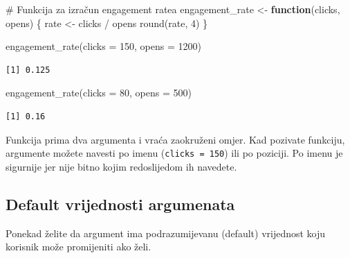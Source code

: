 \documentclass[
  croatian,
  letterpaper,
  DIV=11,
  numbers=noendperiod]{scrartcl}
\newenvironment{Shaded}{\begin{snugshade}}{\end{snugshade}}
\newcommand{\AttributeTok}[1]{\textcolor[rgb]{0.40,0.45,0.13}{#1}}
\newcommand{\CommentTok}[1]{\textcolor[rgb]{0.37,0.37,0.37}{#1}}
\newcommand{\ControlFlowTok}[1]{\textcolor[rgb]{0.00,0.23,0.31}{\textbf{#1}}}
\newcommand{\DecValTok}[1]{\textcolor[rgb]{0.68,0.00,0.00}{#1}}
\newcommand{\FunctionTok}[1]{\textcolor[rgb]{0.28,0.35,0.67}{#1}}
\newcommand{\NormalTok}[1]{\textcolor[rgb]{0.00,0.23,0.31}{#1}}
\newcommand{\OtherTok}[1]{\textcolor[rgb]{0.00,0.23,0.31}{#1}}
\newcommand{\SpecialCharTok}[1]{\textcolor[rgb]{0.37,0.37,0.37}{#1}}
\begin{document}
\begin{Shaded}
\begin{Highlighting}[]
\CommentTok{\# Funkcija za izračun engagement ratea}
\NormalTok{engagement\_rate }\OtherTok{\textless{}{-}} \ControlFlowTok{function}\NormalTok{(clicks, opens) \{}
\NormalTok{  rate }\OtherTok{\textless{}{-}}\NormalTok{ clicks }\SpecialCharTok{/}\NormalTok{ opens}
  \FunctionTok{round}\NormalTok{(rate, }\DecValTok{4}\NormalTok{)}
\NormalTok{\}}

\FunctionTok{engagement\_rate}\NormalTok{(}\AttributeTok{clicks =} \DecValTok{150}\NormalTok{, }\AttributeTok{opens =} \DecValTok{1200}\NormalTok{)}
\end{Highlighting}
\end{Shaded}

\begin{verbatim}
[1] 0.125
\end{verbatim}

\begin{Shaded}
\begin{Highlighting}[]
\FunctionTok{engagement\_rate}\NormalTok{(}\AttributeTok{clicks =} \DecValTok{80}\NormalTok{, }\AttributeTok{opens =} \DecValTok{500}\NormalTok{)}
\end{Highlighting}
\end{Shaded}

\begin{verbatim}
[1] 0.16
\end{verbatim}

Funkcija prima dva argumenta i vraća zaokruženi omjer. Kad pozivate
funkciju, argumente možete navesti po imenu (\texttt{clicks\ =\ 150})
ili po poziciji. Po imenu je sigurnije jer nije bitno kojim redoslijedom
ih navedete.

\subsection{Default vrijednosti
argumenata}\label{default-vrijednosti-argumenata}

Ponekad želite da argument ima podrazumijevanu (default) vrijednost koju
korisnik može promijeniti ako želi.
\end{document}

